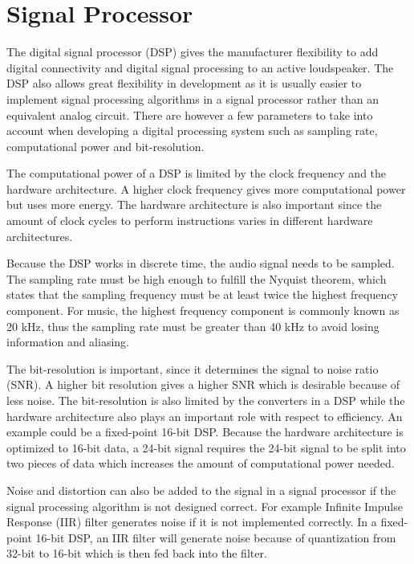 \section{Signal Processor}

The digital signal processor (DSP) gives the manufacturer flexibility to add digital connectivity and digital signal processing to an active loudspeaker. The DSP also allows great flexibility in development as it is usually easier to implement signal processing algorithms in a signal processor rather than an equivalent analog circuit. There are however a few parameters to take into account when developing a digital processing system such as sampling rate, computational power and bit-resolution. 

The computational power of a DSP is limited by the clock frequency and the hardware architecture. A higher clock frequency gives more computational power but uses more energy. The hardware architecture is also important since the amount of clock cycles to perform instructions varies in different hardware architectures.

Because the DSP works in discrete time, the audio signal needs to be sampled. The sampling rate must be high enough to fulfill the Nyquist theorem, which states that the sampling frequency must be at least twice the highest frequency component. For music, the highest frequency component is commonly known as 20 kHz, thus the sampling rate must be greater than 40 kHz to avoid losing information and aliasing.

The bit-resolution is important, since it determines the signal to noise ratio (SNR). A higher bit resolution gives a higher SNR which is desirable because of less noise. The bit-resolution is also limited by the converters in a DSP while the hardware architecture also plays an important role with respect to efficiency. An example could be a fixed-point 16-bit DSP. Because the hardware architecture is optimized to 16-bit data, a 24-bit signal requires the 24-bit signal to be split into two pieces of data which increases the amount of computational power needed.

Noise and distortion can also be added to the signal in a signal processor if the signal processing algorithm is not designed correct. For example Infinite Impulse Response (IIR) filter generates noise if it is not implemented correctly. In a fixed-point 16-bit DSP, an IIR filter will generate noise because of quantization from 32-bit to 16-bit which is then fed back into the filter. 


















